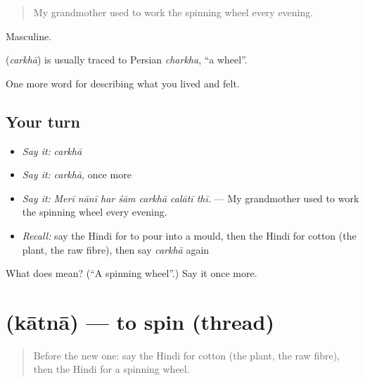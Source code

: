 \begin{quote}
My grandmother used to work the spinning wheel every evening.
\end{quote}

Masculine.

\begin{cousinweb}
\textbf{} (\emph{carkhā}) is usually traced to Persian \emph{charkha}, \textquotedblleft{}a wheel\textquotedblright{}.
\end{cousinweb}

\begin{grammarlens}[title={What you've built}]
One more word for describing what you lived and felt.
\end{grammarlens}

\subsection*{Your turn}
\begin{itemize}
\raggedright
  \item \emph{Say it:} \emph{carkhā}
  \item \emph{Say it:} \emph{carkhā}, once more
  \item \emph{Say it:} \emph{Merī nānī har śām carkhā calātī thī.} — My grandmother used to work the spinning wheel every evening.
  \item \emph{Recall:} say the Hindi for to pour into a mould, then the Hindi for cotton (the plant, the raw fibre), then say \emph{carkhā} again
\end{itemize}

\begin{tcolorbox}[breakable,colback=teal!4,colframe=teal!35!black,title={Before you move on}]
What does  mean? (\textquotedblleft{}A spinning wheel\textquotedblright{}.) Say it once more.
\end{tcolorbox}
\section[\texorpdfstring{\hi{कातना} (kātnā)}{कातना (kātnā)}]{ (kātnā) — to spin (thread)}

\label{lesson:HI-C512-kaatna}



\begin{quote}
Before the new one: say the Hindi for cotton (the plant, the raw fibre), then the Hindi for a spinning wheel.
\end{quote}

